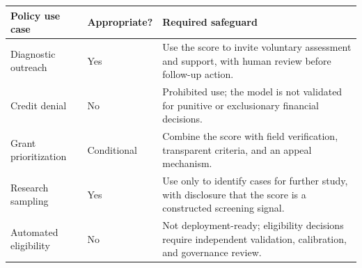 \begin{tabular}{llp{7.2cm}}
\toprule
Policy use case & Appropriate? & Required safeguard \\
\midrule
Diagnostic outreach & Yes & Use the score to invite voluntary assessment and support, with human review before follow-up action. \\
Credit denial & No & Prohibited use; the model is not validated for punitive or exclusionary financial decisions. \\
Grant prioritization & Conditional & Combine the score with field verification, transparent criteria, and an appeal mechanism. \\
Research sampling & Yes & Use only to identify cases for further study, with disclosure that the score is a constructed screening signal. \\
Automated eligibility & No & Not deployment-ready; eligibility decisions require independent validation, calibration, and governance review. \\
\bottomrule
\end{tabular}
